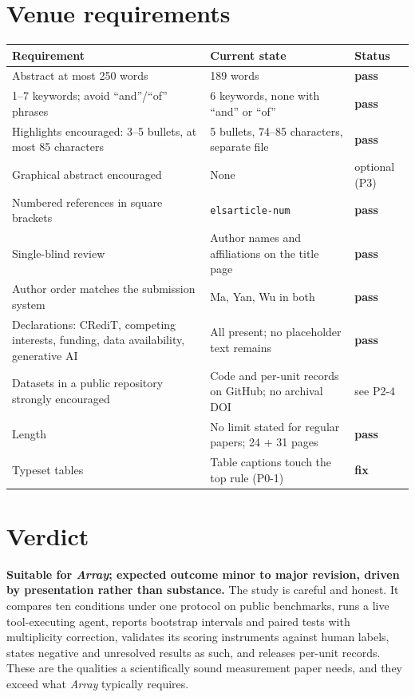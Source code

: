 \documentclass[10pt]{article}
\newcommand{\src}[1]{\texttt{#1}}
\newcommand{\ok}{\textbf{pass}}
\newcommand{\fail}{\textbf{fix}}
\begin{document}
\section{Venue requirements}
\begin{center}
\small
\begin{tabularx}{\textwidth}{@{}p{4.4cm}Yp{1.2cm}@{}}
\toprule
Requirement & Current state & Status \\
\midrule
Abstract at most 250 words & 189 words & \ok \\
1--7 keywords; avoid ``and''/``of'' phrases & 6 keywords, none with ``and'' or ``of'' & \ok \\
Highlights encouraged: 3--5 bullets, at most 85 characters & 5 bullets, 74--85 characters, separate file & \ok \\
Graphical abstract encouraged & None & optional (P3) \\
Numbered references in square brackets & \src{elsarticle-num} & \ok \\
Single-blind review & Author names and affiliations on the title page & \ok \\
Author order matches the submission system & Ma, Yan, Wu in both & \ok \\
Declarations: CRediT, competing interests, funding, data availability, generative AI & All present; no placeholder text remains & \ok \\
Datasets in a public repository strongly encouraged & Code and per-unit records on GitHub; no archival DOI & see P2-4 \\
Length & No limit stated for regular papers; 24 + 31 pages & \ok \\
Typeset tables & Table captions touch the top rule (P0-1) & \fail \\
\bottomrule
\end{tabularx}
\end{center}

\section{Verdict}
\textbf{Suitable for \emph{Array}; expected outcome minor to major revision, driven by presentation rather than
substance.}
The study is careful and honest. It compares ten conditions under one protocol on public benchmarks, runs a live
tool-executing agent, reports bootstrap intervals and paired tests with multiplicity correction, validates its
scoring instruments against human labels, states negative and unresolved results as such, and releases per-unit
records. These are the qualities a scientifically sound measurement paper needs, and they exceed what \emph{Array}
typically requires.
\end{document}
